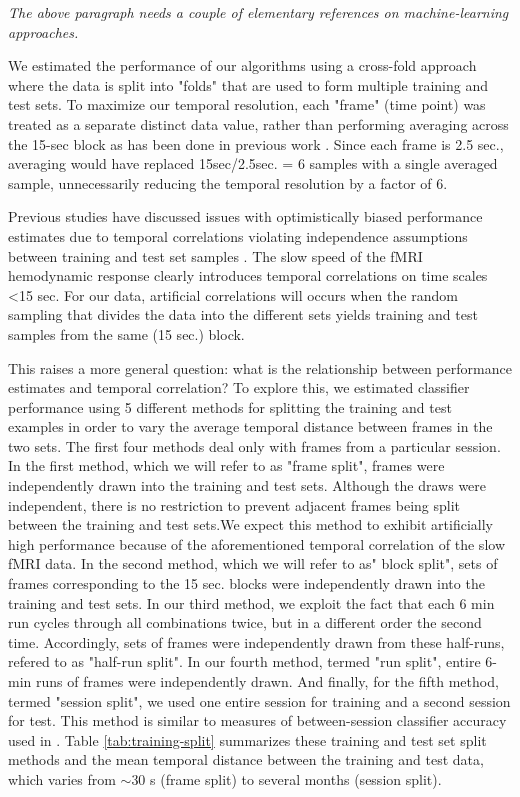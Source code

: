 \documentclass[preprint,5p,authoryear]{elsarticle}
\begin{document}
\emph{The above paragraph needs a couple of elementary references on machine-learning approaches.}

We estimated the performance of our algorithms using a cross-fold approach \citep{Kohavi1995} where the data is split into "folds" that are used to form multiple training and test sets.
To maximize our temporal resolution, each "frame" (time point) was treated as a separate distinct data value, rather than performing averaging across the 15-sec block as has been done in previous work \citep{BlockAveraging}.
Since each frame is 2.5 sec., averaging would have replaced 15sec/2.5sec. = 6 samples with a single averaged sample, unnecessarily reducing the temporal resolution by a factor of 6.


Previous studies have discussed issues with optimistically biased performance estimates due to temporal correlations violating independence assumptions between training and test set samples \citep{Pereira2009}. The slow speed of the fMRI hemodynamic response clearly introduces temporal correlations on time scales <15 sec.
For our data, artificial correlations will occurs when the random sampling that divides the data into the different sets yields training and test samples from the same (15 sec.) block.

This raises a more general question: what is the relationship between performance estimates and temporal correlation?
To explore this, we estimated classifier performance using 5 different methods for splitting the training and test examples in order to vary the average temporal distance between frames in the two sets. 
The first four methods deal only with frames from a particular session.
In the first method, which we will refer to as  "frame split", frames were independently drawn into the training and test sets. 
Although the draws were independent, there is no restriction to prevent adjacent frames being split between the training and test sets.We expect this method to exhibit artificially high performance because of the aforementioned temporal correlation of the slow fMRI data.
In the second method, which we will refer to as" block split", sets of frames corresponding to the 15 sec. blocks were independently drawn into the training and test sets.
In our third method, we exploit the fact that each 6 min run cycles through all combinations twice, but in a different order the second time.
Accordingly, sets of frames were independently drawn from these half-runs, refered to as "half-run split". 
In our fourth method, termed "run split", entire 6-min runs of frames were independently drawn. 
And finally, for the fifth method, termed "session split", we used one entire session for training and a second session for test.
This method is similar to measures of between-session classifier accuracy used in \citep{BetweenSessionAccuracy}.
Table \ref{tab:training-split} summarizes these training and test set split methods and the mean temporal distance between the training and test data, which varies from $\sim$30 s (frame split) to several months (session split).
\end{document}
